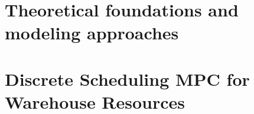\documentclass[a4paper,12pt]{report}
\begin{document}
\setcounter{chapter}{1}
\chapter{Theoretical foundations and modeling approaches}

\chapter{Discrete Scheduling MPC for Warehouse Resources}

\printbibliography
\end{document}
